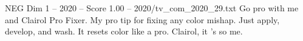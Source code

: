 \begin{textsample}{NEG Dim 1 – 2020 – Score 1.00 – 2020/tv\_com\_2020\_29.txt}  \label{ex:f1_neg_019}
Go pro with me and Clairol Pro Fixer.
My pro tip for fixing any color mishap.
Just apply, develop, and wash.
It resets color like a pro.
Clairol, it 's so me.

\end{textsample}

